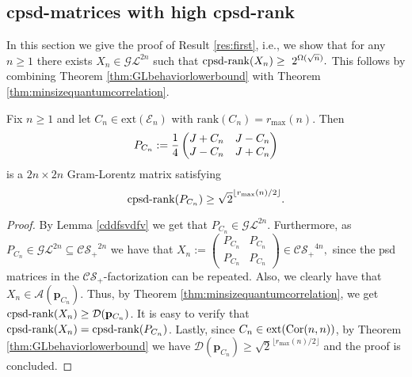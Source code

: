 \documentclass{siamart}
\begin{document}
\subsection{cpsd-matrices with high cpsd-rank}\label{sec:highcpsdrank}

In this  section we give the proof of  Result \ref{res:first}, i.e.,  we show that for any $n\ge 1$ there exists   $X_n\in {\mathcal{GL}}^{2n}$  such that ${\mathrm{cpsd}\textnormal{-rank}}(X_n)\ge~2^{\Omega(\sqrt{n})}.$ This follows by combining   Theorem \ref{thm:GLbehaviorlowerbound}  with Theorem \ref{thm:minsizequantumcorrelation}.

\medskip
\begin{theorem}\label{thm:lboundgl}
Fix  $n\ge 1$ and let  $C_n\in {\mathrm{ext}} ({\mathcal{E}}_n)$ with  ${\mathrm{rank}}(C_n)=r_{\max}(n)$. Then
\begin{equation}\label{eq:goodglmatrix}
P_{C_n}:=
{1\over 4} \begin{pmatrix}J+C_n & J-C_n\\J-C_n& J+C_n\end{pmatrix}
\end{equation}
is a  $2n\times 2n$ Gram-Lorentz matrix
satisfying
 \begin{equation}\label{eq:cedfergrth}
{\mathrm{cpsd}\textnormal{-rank}}(P_{C_n})\ge  {\sqrt{2}^{\lfloor {r_{\max}}(n)/ 2\rfloor}}.
\end{equation}
\end{theorem}
\medskip

\begin{proof}
By Lemma \ref{cddfsvdfv} we get  that ${P_{C_n}\in {\mathcal{GL}}^{2n}}$.
Furthermore, as   $P_{C_n}\in{\mathcal{GL}}^{2n}\subseteq  {\mathcal{CS}_+}^{2n}$ we
have that $X_n := \left(\begin{smallmatrix}P_{C_n} & P_{C_n}\\P_{C_n} & P_{C_n}\end{smallmatrix}\right)\in {{\mathcal{CS}_+}^{4n}},$ {since the psd matrices in the ${\mathcal{CS}_+}$-factorization can be repeated}. {Also, we clearly have that $X_n \in {\mathcal{A}}({\mathbf{p}}_{C_n})$. Thus, by Theorem \ref{thm:minsizequantumcorrelation}}, we get   ${{\mathrm{cpsd}\textnormal{-rank}}(X_n) \geq \mathcal{D}({\mathbf{p}}_{C_n})}$.  {It is easy to verify that ${\mathrm{cpsd}\textnormal{-rank}}(X_n) = {\mathrm{cpsd}\textnormal{-rank}}(P_{C_n})$}. Lastly, since  $C_n\in {\mathrm{ext}} ({\rm Cor}(n,n))$, by Theorem \ref{thm:GLbehaviorlowerbound} we have $\mathcal{D}({\mathbf{p}}_{C_n})\geq {\sqrt{2}^{\lfloor {r_{\max}}(n)/ 2\rfloor}}$ and the proof is concluded.
\end{proof}
\end{document}
